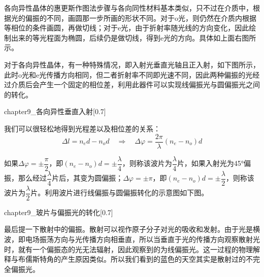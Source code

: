 各向异性晶体的惠更斯作图法步骤与各向同性材料基本类似，只不过在介质中，根据光的偏振的不同，画圆那一步所画的形状不同。对于o光，则仍然在介质内根据等相位的条件画圆，再做切线；对于e光，由于折射率随光线的方向变化，因此绘制出来的等光程面为椭圆，后续仍是做切线，得到e光的方向。具体如上面右图所示。

对于各向异性晶体，有一种特殊情况，即入射光垂直光轴且正入射，如下图所示，此时o光和e光传播方向相同，但二者折射率不同即光速不同，因此两种偏振的光经过介质后会产生一个固定的相位差，利用此器件可以实现线偏振光与圆偏振光之间的转化。
\begin{singlefigure}[各向异性垂直入射]{chapter9_各向异性垂直入射}[0.7]
\end{singlefigure}

我们可以很轻松地得到光程差以及相位差的关系：
\[\Delta l=n_e d - n_o d\quad\Rightarrow\quad \Delta \varphi=\dfrac{2\pi}{\lambda}(n_e-n_o)d\]

如果$\Delta \varphi = \pm\dfrac{\pi}{2}$，即$(n_e-n_o)d=\pm\dfrac{\lambda}{4}$，则称该波片为$\dfrac{\lambda}{4}$片，如果入射光为45°偏振，那么经过$\dfrac{\lambda}{4}$片后，其变为圆偏振；$\Delta \varphi = \pm\pi$，即$(n_e-n_o)d=\pm\dfrac{\lambda}{2}$，则称该波片为$\dfrac{\lambda}{2}$片。利用波片进行线偏振与圆偏振转化的示意图如下图。
\begin{singlefigure}[玻片与偏振光的转化]{chapter9_玻片与偏振光的转化}[0.7]
\end{singlefigure}

最后提一下散射中的偏振。散射可以视作原子分子对光的吸收和发射。由于光是横波，即电场振荡方向与光传播方向相垂直，所以当垂直于光的传播方向观察散射光时，就有一个偏振态的光无法辐射，因此观察到的为线偏振光。这一过程的物理解释与布儒斯特角的产生原因类似。所以我们看到的蓝色的天空其实是散射过的不完全偏振光。


